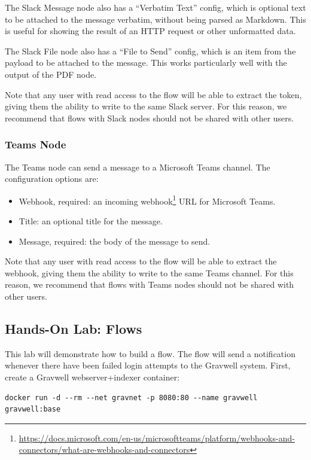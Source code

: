 The Slack Message node also has a ``Verbatim Text'' config, which is optional text to be attached to the message verbatim, without being parsed as Markdown. This is useful for showing the result of an HTTP request or other unformatted data.

The Slack File node also has a ``File to Send'' config, which is an item from the payload to be attached to the message. This works particularly well with the output of the PDF node.

Note that any user with read access to the flow will be able to extract the token, giving them the ability to write to the same Slack server. For this reason, we recommend that flows with Slack nodes should not be shared with other users.

\subsubsection{Teams Node}
The Teams node can send a message to a Microsoft Teams channel. The configuration options are:

\begin{itemize}
\item Webhook, required: an incoming webhook\footnote{\href{https://docs.microsoft.com/en-us/microsoftteams/platform/webhooks-and-connectors/what-are-webhooks-and-connectors}{https://docs.microsoft.com/en-us/microsoftteams/platform/webhooks-and-connectors/what-are-webhooks-and-connectors}} URL for Microsoft Teams.
\item Title: an optional title for the message.
\item Message, required: the body of the message to send.
\end{itemize}

Note that any user with read access to the flow will be able to extract the webhook, giving them the ability to write to the same Teams channel. For this reason, we recommend that flows with Teams nodes should not be shared with other users.

\clearpage
\subsection{Hands-On Lab: Flows}

This lab will demonstrate how to build a flow. The flow will send a notification whenever there have been failed login attempts to the Gravwell system. First, create a Gravwell webserver+indexer container:

\begin{Verbatim}[breaklines=true]
docker run -d --rm --net gravnet -p 8080:80 --name gravwell gravwell:base
\end{Verbatim}

